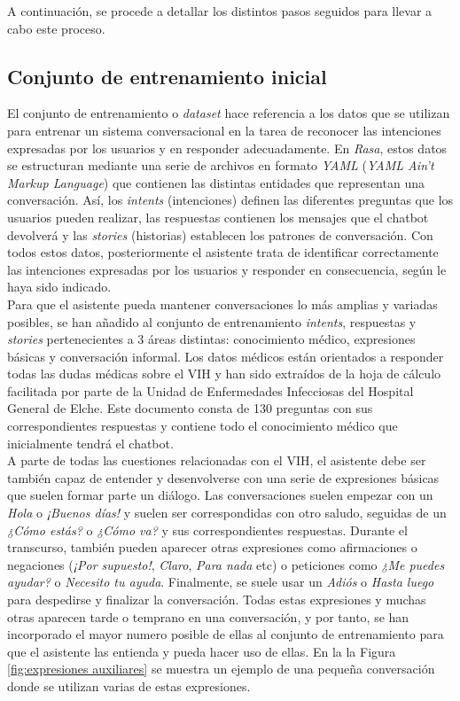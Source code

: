 A continuación, se procede a detallar los distintos pasos seguidos para llevar a cabo este proceso.\\


\subsection{Conjunto de entrenamiento inicial}
El conjunto de entrenamiento o \textit{dataset} hace referencia a los datos que se utilizan para entrenar un sistema conversacional en la tarea de reconocer las intenciones expresadas por los usuarios y en responder adecuadamente. En \textit{Rasa}, estos datos se estructuran mediante una serie de archivos en formato \textit{YAML} (\textit{YAML Ain't Markup Language}) que contienen las distintas entidades que representan una conversación. Así, los \textit{intents}  (intenciones) definen las diferentes preguntas que los usuarios pueden realizar, las respuestas contienen los mensajes que el chatbot devolverá y las \textit{stories} (historias) establecen los patrones de conversación. Con todos estos datos, posteriormente el asistente trata de identificar correctamente las intenciones expresadas por los usuarios y responder en consecuencia, según le haya sido indicado.\\

Para que el asistente pueda mantener conversaciones lo más amplias y variadas posibles, se han añadido al conjunto de entrenamiento \textit{intents}, respuestas y \textit{stories} pertenecientes a 3 áreas distintas: conocimiento médico, expresiones básicas y conversación informal. Los datos médicos están orientados a responder todas las dudas médicas sobre el VIH y han sido extraídos de la hoja de cálculo facilitada por parte de la Unidad de Enfermedades Infecciosas del Hospital General de Elche. Este documento consta de 130 preguntas con sus correspondientes respuestas y contiene todo el conocimiento médico que inicialmente tendrá el chatbot.\\

A parte de todas las cuestiones relacionadas con el VIH, el asistente debe ser también capaz de entender y desenvolverse con una serie de expresiones básicas que suelen formar parte un diálogo. Las conversaciones suelen empezar con un \textit{Hola} o \textit{¡Buenos días!} y suelen ser correspondidas con otro saludo, seguidas de un \textit{¿Cómo estás?} o \textit{¿Cómo va?} y sus correspondientes respuestas. Durante el transcurso, también pueden aparecer otras expresiones como afirmaciones o negaciones (\textit{¡Por supuesto!}, \textit{Claro}, \textit{Para nada} etc) o peticiones como \textit{¿Me puedes ayudar?} o \textit{Necesito tu ayuda}. Finalmente, se suele usar un \textit{Adiós} o \textit{Hasta luego} para despedirse y finalizar la conversación. Todas estas expresiones y muchas otras aparecen tarde o temprano en una conversación, y por tanto, se han incorporado el mayor numero posible de ellas al conjunto de entrenamiento para que el asistente las entienda y pueda hacer uso de ellas. En la la Figura \ref{fig:expresiones auxiliares} se muestra un ejemplo de una pequeña conversación donde se utilizan varias de estas expresiones.\\

